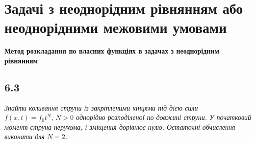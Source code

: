 \documentclass[a4paper, 14pt]{extreport}
\begin{document}
\chapter{Задачі з неоднорідним рівнянням або неоднорідними межовими умовами}

\textbf{\large Метод розкладання по власних функціях в задачах з неоднорідним рівнянням}

\section[Задача №6.3]{6.3}

\textit{Знайти коливання струни із закріпленими кінцями під дією сили $f(x,t) = f_0 t^N, \, N > 0$ однорідно розподіленої по довжині струни. У початковий момент струна нерухома, і зміщення дорівнює нулю. Остаточні обчислення виконати
для $N=2$.}
\end{document}
